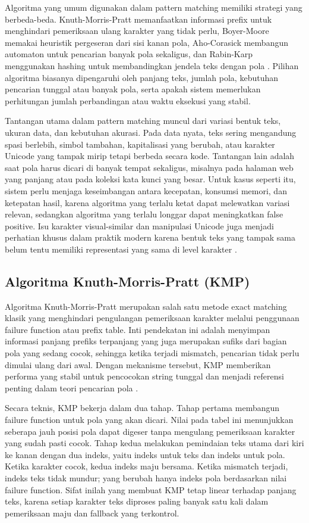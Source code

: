 Algoritma yang umum digunakan dalam pattern matching memiliki strategi yang berbeda-beda. Knuth-Morris-Pratt memanfaatkan informasi prefix untuk menghindari pemeriksaan ulang karakter yang tidak perlu, Boyer-Moore memakai heuristik pergeseran dari sisi kanan pola, Aho-Corasick membangun automaton untuk pencarian banyak pola sekaligus, dan Rabin-Karp menggunakan hashing untuk membandingkan jendela teks dengan pola \cite{knuth1977fast,boyer1977fast,aho1975efficient,karp1987efficient}. Pilihan algoritma biasanya dipengaruhi oleh panjang teks, jumlah pola, kebutuhan pencarian tunggal atau banyak pola, serta apakah sistem memerlukan perhitungan jumlah perbandingan atau waktu eksekusi yang stabil.

Tantangan utama dalam pattern matching muncul dari variasi bentuk teks, ukuran data, dan kebutuhan akurasi. Pada data nyata, teks sering mengandung spasi berlebih, simbol tambahan, kapitalisasi yang berubah, atau karakter Unicode yang tampak mirip tetapi berbeda secara kode. Tantangan lain adalah saat pola harus dicari di banyak tempat sekaligus, misalnya pada halaman web yang panjang atau pada koleksi kata kunci yang besar. Untuk kasus seperti itu, sistem perlu menjaga keseimbangan antara kecepatan, konsumsi memori, dan ketepatan hasil, karena algoritma yang terlalu ketat dapat melewatkan variasi relevan, sedangkan algoritma yang terlalu longgar dapat meningkatkan false positive. Isu karakter visual-similar dan manipulasi Unicode juga menjadi perhatian khusus dalam praktik modern karena bentuk teks yang tampak sama belum tentu memiliki representasi yang sama di level karakter \cite{unicode_tr39}.

\subsection{Algoritma Knuth-Morris-Pratt (KMP)}

Algoritma Knuth-Morris-Pratt merupakan salah satu metode exact matching klasik yang menghindari pengulangan pemeriksaan karakter melalui penggunaan failure function atau prefix table. Inti pendekatan ini adalah menyimpan informasi panjang prefiks terpanjang yang juga merupakan sufiks dari bagian pola yang sedang cocok, sehingga ketika terjadi mismatch, pencarian tidak perlu dimulai ulang dari awal. Dengan mekanisme tersebut, KMP memberikan performa yang stabil untuk pencocokan string tunggal dan menjadi referensi penting dalam teori pencarian pola \cite{knuth1977fast}.

Secara teknis, KMP bekerja dalam dua tahap. Tahap pertama membangun failure function untuk pola yang akan dicari. Nilai pada tabel ini menunjukkan seberapa jauh posisi pola dapat digeser tanpa mengulang pemeriksaan karakter yang sudah pasti cocok. Tahap kedua melakukan pemindaian teks utama dari kiri ke kanan dengan dua indeks, yaitu indeks untuk teks dan indeks untuk pola. Ketika karakter cocok, kedua indeks maju bersama. Ketika mismatch terjadi, indeks teks tidak mundur; yang berubah hanya indeks pola berdasarkan nilai failure function. Sifat inilah yang membuat KMP tetap linear terhadap panjang teks, karena setiap karakter teks diproses paling banyak satu kali dalam pemeriksaan maju dan fallback yang terkontrol.

